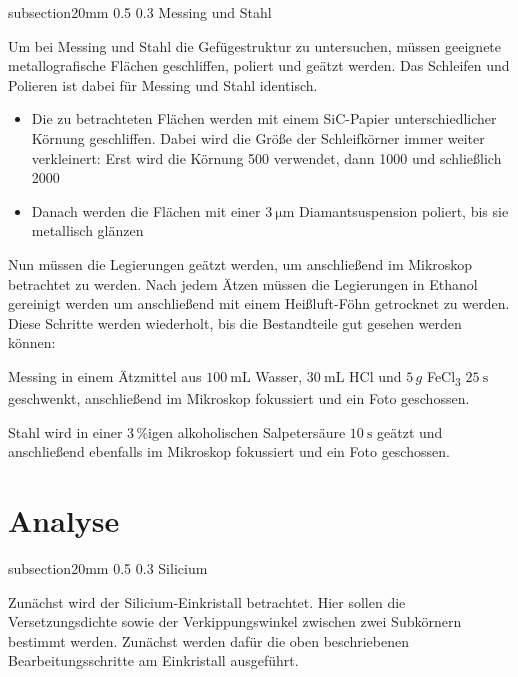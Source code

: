 \documentclass[german, %
parskip=full, %
bibliography=totoc, %
]{scrartcl}
\makeatletter
\renewcommand\subsection{\@startsection 
   {subsection}{2}{0mm}%
   {0.5\baselineskip}%
   {0.3\baselineskip}%
   {\bfseries\sffamily\large}%
   }
\makeatother
\begin{document}
\subsection{Messing und Stahl}

Um bei Messing und Stahl die Gefügestruktur zu untersuchen, müssen geeignete metallografische Flächen geschliffen, poliert und geätzt werden. Das Schleifen und Polieren ist dabei für Messing und Stahl identisch. 

\begin{itemize}
\item[1.] Die zu betrachteten Flächen werden mit einem SiC-Papier unterschiedlicher Körnung geschliffen. Dabei wird die Größe der Schleifkörner immer weiter verkleinert: Erst wird die Körnung 500 verwendet, dann 1000 und schließlich 2000
\item[2.] Danach werden die Flächen mit einer \(\SI{3}{\micro\meter}\) Diamantsuspension poliert, bis sie metallisch glänzen
\end{itemize}

Nun müssen die Legierungen geätzt werden, um anschließend im Mikroskop betrachtet zu werden. Nach jedem Ätzen müssen die Legierungen in Ethanol gereinigt werden um anschließend mit einem Heißluft-Föhn getrocknet zu werden. Diese Schritte werden wiederholt, bis die Bestandteile gut gesehen werden können:

Messing in einem Ätzmittel aus \(\SI{100}{\milli\liter}\) Wasser, \(\SI{30}{\milli\liter}\) HCl und $5\,g$ FeCl\textsubscript{3} \(\SI{25}{\second}\) geschwenkt, anschließend im Mikroskop fokussiert und ein Foto geschossen.

Stahl wird in einer 3\,\%igen alkoholischen Salpetersäure \(\SI{10}{\second}\) geätzt und anschließend ebenfalls im Mikroskop fokussiert und ein Foto geschossen.

\section{Analyse}

\subsection{Silicium}

Zunächst wird der Silicium-Einkristall betrachtet. Hier sollen die Versetzungsdichte sowie der Verkippungswinkel zwischen zwei Subkörnern bestimmt werden. Zunächst werden dafür die oben beschriebenen Bearbeitungsschritte am Einkristall ausgeführt. 
\end{document}
